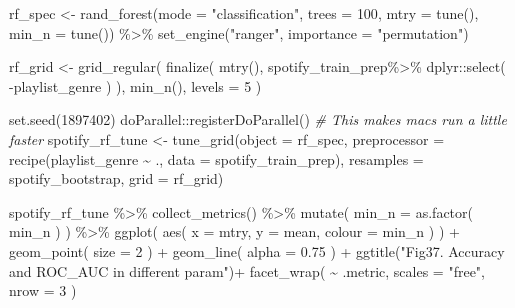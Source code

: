 \documentclass[
]{article}
\newenvironment{Shaded}{\begin{snugshade}}{\end{snugshade}}
\newcommand{\AttributeTok}[1]{\textcolor[rgb]{0.77,0.63,0.00}{#1}}
\newcommand{\CommentTok}[1]{\textcolor[rgb]{0.56,0.35,0.01}{\textit{#1}}}
\newcommand{\DecValTok}[1]{\textcolor[rgb]{0.00,0.00,0.81}{#1}}
\newcommand{\FloatTok}[1]{\textcolor[rgb]{0.00,0.00,0.81}{#1}}
\newcommand{\FunctionTok}[1]{\textcolor[rgb]{0.00,0.00,0.00}{#1}}
\newcommand{\NormalTok}[1]{#1}
\newcommand{\OtherTok}[1]{\textcolor[rgb]{0.56,0.35,0.01}{#1}}
\newcommand{\SpecialCharTok}[1]{\textcolor[rgb]{0.00,0.00,0.00}{#1}}
\newcommand{\StringTok}[1]{\textcolor[rgb]{0.31,0.60,0.02}{#1}}
\begin{document}
\begin{Shaded}
\begin{Highlighting}[]
\NormalTok{rf\_spec }\OtherTok{\textless{}{-}} \FunctionTok{rand\_forest}\NormalTok{(}\AttributeTok{mode =} \StringTok{"classification"}\NormalTok{,}
                       \AttributeTok{trees =} \DecValTok{100}\NormalTok{,}
                       \AttributeTok{mtry =} \FunctionTok{tune}\NormalTok{(),}
                       \AttributeTok{min\_n =} \FunctionTok{tune}\NormalTok{()) }\SpecialCharTok{\%\textgreater{}\%}
  \FunctionTok{set\_engine}\NormalTok{(}\StringTok{"ranger"}\NormalTok{, }\AttributeTok{importance =} \StringTok{"permutation"}\NormalTok{)}

\NormalTok{rf\_grid }\OtherTok{\textless{}{-}} \FunctionTok{grid\_regular}\NormalTok{( }
  \FunctionTok{finalize}\NormalTok{( }\FunctionTok{mtry}\NormalTok{(), }
\NormalTok{            spotify\_train\_prep}\SpecialCharTok{\%\textgreater{}\%} 
\NormalTok{              dplyr}\SpecialCharTok{::}\FunctionTok{select}\NormalTok{( }\SpecialCharTok{{-}}\NormalTok{playlist\_genre ) ),}
  \FunctionTok{min\_n}\NormalTok{(),}
  \AttributeTok{levels =} \DecValTok{5}\NormalTok{ )}

\FunctionTok{set.seed}\NormalTok{(}\DecValTok{1897402}\NormalTok{)}
\NormalTok{doParallel}\SpecialCharTok{::}\FunctionTok{registerDoParallel}\NormalTok{() }\CommentTok{\# This makes macs run a little faster}
\NormalTok{spotify\_rf\_tune }\OtherTok{\textless{}{-}} \FunctionTok{tune\_grid}\NormalTok{(}\AttributeTok{object =}\NormalTok{ rf\_spec,}
                             \AttributeTok{preprocessor =} \FunctionTok{recipe}\NormalTok{(playlist\_genre }\SpecialCharTok{\textasciitilde{}}\NormalTok{ ., }\AttributeTok{data =}\NormalTok{ spotify\_train\_prep),}
                             \AttributeTok{resamples =}\NormalTok{ spotify\_bootstrap,}
                             \AttributeTok{grid =}\NormalTok{ rf\_grid)}

\NormalTok{spotify\_rf\_tune }\SpecialCharTok{\%\textgreater{}\%} 
 \FunctionTok{collect\_metrics}\NormalTok{() }\SpecialCharTok{\%\textgreater{}\%} 
  \FunctionTok{mutate}\NormalTok{( }\AttributeTok{min\_n =} \FunctionTok{as.factor}\NormalTok{( min\_n ) ) }\SpecialCharTok{\%\textgreater{}\%} 
  \FunctionTok{ggplot}\NormalTok{( }\FunctionTok{aes}\NormalTok{( }\AttributeTok{x =}\NormalTok{ mtry, }\AttributeTok{y =}\NormalTok{ mean, }\AttributeTok{colour =}\NormalTok{ min\_n ) ) }\SpecialCharTok{+}
  \FunctionTok{geom\_point}\NormalTok{( }\AttributeTok{size =} \DecValTok{2}\NormalTok{ ) }\SpecialCharTok{+}
  \FunctionTok{geom\_line}\NormalTok{( }\AttributeTok{alpha =} \FloatTok{0.75}\NormalTok{ ) }\SpecialCharTok{+}
  \FunctionTok{ggtitle}\NormalTok{(}\StringTok{"Fig37. Accuracy and ROC\_AUC in different param"}\NormalTok{)}\SpecialCharTok{+}
  \FunctionTok{facet\_wrap}\NormalTok{( }\SpecialCharTok{\textasciitilde{}}\NormalTok{ .metric, }\AttributeTok{scales =} \StringTok{"free"}\NormalTok{, }\AttributeTok{nrow =} \DecValTok{3}\NormalTok{ )}
\end{Highlighting}
\end{Shaded}
\end{document}
